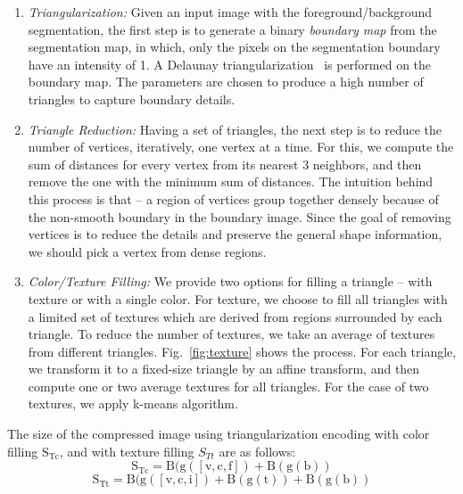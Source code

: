 \begin{enumerate} %
	\vspace{.5em}
	\item \textit{Triangularization:} Given an input image with the foreground/background segmentation, the first step is to generate a binary \textit{boundary map} from the segmentation map, in which, only the pixels on the segmentation boundary have an intensity of 1. A Delaunay triangularization~\cite{de2000computational} is performed on the boundary map. The parameters are chosen to produce a high number of triangles to capture boundary details.

	\vspace{.5em}
	\item \textit{Triangle Reduction:} Having a set of triangles, the next step is to reduce the number of vertices, iteratively, one vertex at a time. For this, we compute the sum of distances for every vertex from its nearest 3 neighbors, and then remove the one with the minimum sum of distances. The intuition behind this process is that --  a region of vertices group together densely because of the non-smooth boundary in the boundary image. Since the goal of removing vertices is to reduce the details and preserve the general shape information, we should pick a vertex from dense regions.

	\vspace{.5em}
	\item \textit{Color/Texture Filling:} We provide two options for filling a triangle -- with texture or with a single color. For texture, we choose to fill all triangles with a limited set of textures which are derived from regions surrounded by each triangle. To reduce the number of textures, we take an average of textures from different triangles. Fig.~\ref{fig:texture} shows the process. For each triangle, we transform it to a fixed-size triangle by an affine transform, and then compute one or two average textures for all triangles. For the case of two textures, we apply k-means algorithm.
\end{enumerate}

The size of the compressed image using triangularization encoding with color filling $\mathrm{S_{Tc}}$, and with texture filling $S_{Tt}$ are as follows:
\begin{equation}
\mathrm{S_{Tc} = B(g([v, c, f]) + B(g(b))}
\end{equation}
\begin{equation}
\mathrm{S_{Tt} = B(g([v, c, i]) + B(g(t)) + B(g(b))}
\end{equation}



